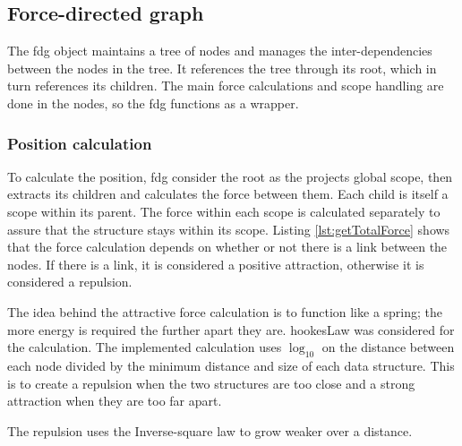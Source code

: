 \subsection{Force-directed graph}
The \gls{fdg} object maintains a tree of nodes and manages the inter-dependencies between the nodes in the tree. It references the tree through its root, which in turn references its children. The main force calculations and scope handling are done in the nodes, so the \gls{fdg} functions as a wrapper.

\subsubsection{Position calculation}



To calculate the position, \gls{fdg} consider the root as the projects global scope, then extracts its children and calculates the force between them. Each child is itself a scope within its parent. The force within each scope is calculated separately to assure that the structure stays within its scope. Listing \ref{lst:getTotalForce} shows that the force calculation depends on whether or not there is a link between the nodes. If there is a link, it is considered a positive attraction, otherwise it is considered a repulsion. 

The idea behind the attractive force calculation is to function like a spring; the more energy is required the further apart they are. \gls{hookesLaw} was considered for the calculation. The implemented calculation uses $ \log_{10} $ on the distance between each node divided by the minimum distance and size of each data structure. This is to create a repulsion when the two structures are too close and a strong attraction when they are too far apart. 

The repulsion uses the Inverse-square law \cite{enc:inverseSquare} to grow weaker over a distance.

